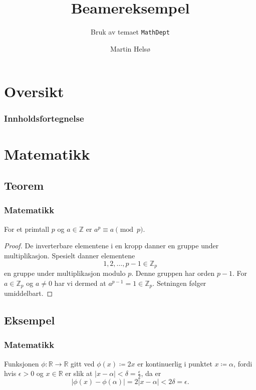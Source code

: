 \documentclass[norsk]{beamer}
\author{Martin Helsø}
\title{Beamereksempel}
\subtitle{Bruk av temaet \texttt{MathDept}}
\begin{document}
\section{Oversikt}


%
%
\begin{frame}
    \frametitle{Innholdsfortegnelse}
    \tableofcontents[currentsection]
\end{frame}


\section{Matematikk}


\subsection{Teorem}


\begin{frame}
    \frametitle{Matematikk}

    \begin{theorem}
        For et primtall $p$ og $a \in \mathbb{Z}$ er $a^p \equiv a \pmod{p}$.
    \end{theorem}

    \begin{proof}
        De inverterbare elementene i en kropp danner en gruppe under multi\-plikasjon.
        Spesielt danner elementene 
        \[
            1, 2, \ldots, p-1 \in \mathbb{Z}_p
        \]
        en gruppe under multiplikasjon modulo $p$.
        Denne gruppen har orden $p - 1$.
        For $a \in \mathbb{Z}_p$ og $a \neq 0$ har vi dermed at $a^{p-1} = 1 \in \mathbb{Z}_p$.
        Setningen følger umiddelbart.
    \end{proof}
\end{frame}


\subsection{Eksempel}


\begin{frame}
    \frametitle{Matematikk}

    \begin{example}
        Funksjonen $\phi \colon \mathbb{R} \to \mathbb{R}$
        gitt ved $\phi(x) \coloneqq 2x$
        er kontinuerlig i punktet $x \coloneqq \alpha$,
        fordi hvis $\epsilon > 0$ og $x \in \mathbb{R}$
        er slik at $|x - \alpha| < \delta = \frac{\epsilon}{2}$,
        da er
        \begin{equation*}
            |\phi(x) - \phi(\alpha)| = 2|x - \alpha| < 2\delta = \epsilon.
        \end{equation*}
    \end{example}
\end{frame}
\end{document}
